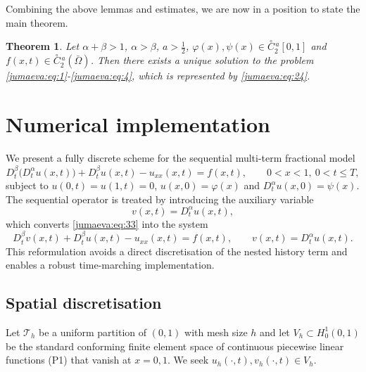 \documentclass{amsart}
\numberwithin{equation}{section}
\newtheorem{thm}{Theorem}[section]
\begin{document}
Combining the above lemmas and estimates, we are now in a position to state the main theorem.

\begin{thm}
Let $\alpha+\beta>1$, $\alpha>\beta$, $a>\frac{1}{2}$, $\varphi(x),\psi(x)\in {\overset{\circ}{C}{}^{\,a}_2[0,1]}$ and $f(x,t)\in{\overset{\circ}{C}{}^{\,a}_2(\bar{\Omega})}$. Then there exists a unique  solution to the problem \eqref{jumaeva:eq:1}-\eqref{jumaeva:eq:4}, which is represented by  \eqref{jumaeva:eq:24}.\label{jumaeva:thm1}
\end{thm}

\section{Numerical implementation}\label{jumaeva:sec:5}

We present a fully discrete scheme for the sequential multi-term fractional model
\begin{equation}
D_t^\beta\!\big(D_t^\alpha u(x,t)\big) + D_t^\beta u(x,t) - u_{xx}(x,t) = f(x,t), 
\qquad 0<x<1,\ 0<t\le T,\label{jumaeva:eq:33}
\end{equation}
subject to $u(0,t)=u(1,t)=0$, $u(x,0)=\varphi(x)$ and $D_t^\alpha u(x,0)=\psi(x)$.
The sequential operator is treated by introducing the auxiliary variable
\begin{equation*}
v(x,t) = D_t^\alpha u(x,t),
\end{equation*}
which converts \eqref{jumaeva:eq:33} into the system
\begin{equation}
D_t^\beta v(x,t) + D_t^\beta u(x,t) - u_{xx}(x,t) = f(x,t), 
\qquad v(x,t)=D_t^\alpha u(x,t).\label{jumaeva:eq:34}
\end{equation}
This reformulation avoids a direct discretisation of the nested history term and enables a robust time-marching implementation. 

\subsection{Spatial discretisation}
Let $\mathcal{T}_h$ be a uniform partition of $(0,1)$ with mesh size $h$ and let 
$V_h\subset H_0^1(0,1)$ be the standard conforming finite element space of continuous piecewise linear functions (P1) that vanish at $x=0,1$.
We seek $ u_h(\cdot,t), v_h(\cdot,t)\in V_h.$
\end{document}
